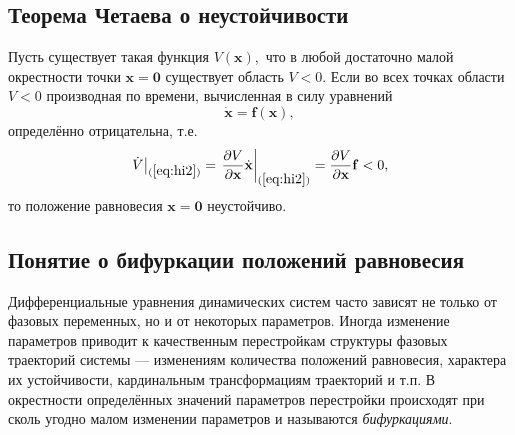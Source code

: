 \documentclass[a4paper]{article}
\begin{document}
\subsection{Теорема Четаева о неустойчивости}
\begin{thm}
	Пусть существует такая функция $V(\mathbf{x})$, что в любой достаточно
	малой окрестности точки $\mathbf{x}=\mathbf{0}$ существует область
	$V<0$. Если во всех точках области $V<0$ производная  по времени,
	вычисленная в силу уравнений
			\[
				\dot{\mathbf{x}}=\mathbf{f}(\mathbf{x}) \tag{*}
				\label{eq:hi_3}
			,\]
	определённо отрицательна, т.\:е.
\[
			\left. \dot{V}  \right|_{(\ref{eq:hi2})}=
			\left.\frac{\partial V}{\partial \mathbf{x}} \dot{\mathbf{x}}
			\right|_{(\ref{eq:hi2})}=\frac{\partial V}{\partial  \mathbf{x}}
			\mathbf{f}< 0
		,\]
	то положение равновесия $\mathbf{x}=\mathbf{0}$ неустойчиво.
\end{thm}

\subsection{Понятие о бифуркации положений равновесия}
Дифференциальные уравнения динамических систем часто зависят не только от
фазовых переменных, но и от некоторых параметров.
Иногда изменение параметров приводит к качественным перестройкам  структуры
фазовых траекторий системы --- изменениям количества положений равновесия,
характера их устойчивости, кардинальным трансформациям траекторий и т.\;п.
В окрестности определённых значений параметров перестройки происходят при
сколь угодно малом изменении параметров и называются \emph{бифуркациями}.
\end{document}
